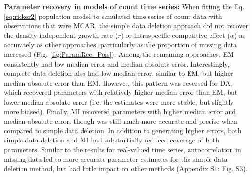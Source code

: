 \documentclass[12pt,english]{article} %
\begin{document}
\begin{linenumbers}
\begin{spacing}{1.9}
\begin{flushleft}
\textbf{Parameter recovery in models of count time series:} When fitting the Eq. \ref{eq:ricker2} population model to simulated time series of count data with observations that were MCAR, the simple data deletion approach did not recover the density-independent growth rate ($r$) or intraspecific competitive effect ($\alpha$) as accurately as other approaches, particularly as the proportion of missing data increased (Fig. \ref{fig:ParamRec_Pois}). Among the remaining approaches, EM consistently had low median error and median absolute error. Interestingly, complete data deletion also had low median error, similar to EM, but higher median absolute error than EM. However, this pattern was reversed for DA, which recovered parameters with relatively higher median error than EM, but lower median absolute error (i.e. the estimates were more stable, but slightly more biased). Finally, MI recovered parameters with higher median error and median absolute error, though was still much more accurate and precise when compared to simple data deletion. In addition to generating higher errors, both simple data deletion and MI had substantially reduced coverage of both parameters. Similar to the results for real-valued time series, autocorrelation in missing data led to more accurate parameter estimates for the simple data deletion method, but had little impact on other methods (Appendix S1: Fig. S3).



\end{flushleft}
\end{spacing}
\end{linenumbers}
\end{document}
